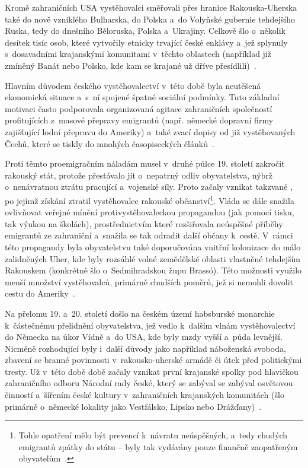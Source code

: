 Kromě zahraničních USA vystěhovalci směřovali přes hranice Rakouska-Uherska také do nově vzniklého Bulharska, do Polska a~do Volyňské gubernie tehdejšího Ruska, tedy do dnešního Běloruska, Polska a~Ukrajiny. Celkově šlo o~několik desítek tisíc osob, které vytvořily etnicky trvající české enklávy a~jež splynuly s~dosavadními krajanskými komunitami v~těchto oblastech (například již zmíněný Banát nebo Polsko, kde kam se krajané už dříve přesídlili)~\parencite{Nespor2005}.

Hlavním důvodem českého vystěhovalectví v~této době byla neutěšená ekonomická situace a~s~ní spojené špatné sociální podmínky. Tuto základní motivaci často podporovala organizovaná agitace zahraničních společností profitujících z~masové přepravy emigrantů (např. německé dopravní firmy zajišťující lodní přepravu do Ameriky) a~také zvací dopisy od již vystěhovaných Čechů, které se tiskly do mnohých časopiseckých článků~\parencite{Vaculik2009a}.

Proti těmto proemigračním náladám musel v~druhé půlce 19. století zakročit rakouský stát, protože přestávalo jít o~nepatrný odliv obyvatelstva, nýbrž o~nenávratnou ztrátu pracující a~vojenské síly. Proto začaly vznikat takzvané , po jejímž získání ztratil vystěhovalec rakouské občanství\footnote{Tohle opatření mělo být prevencí k~návratu neúspěšných, a~tedy chudých emigrantů zpátky do státu – byly tak vydávány pouze finančně zaopatřeným obyvatelům~\parencite{Vaculik2002}.}. Vláda se dále snažila ovlivňovat veřejné mínění protivystěhovaleckou propagandou (jak pomocí tisku, tak výukou na školách), prostřednictvím které rozšiřovala neúspěšné příběhy emigrantů ze zahraniční a~snažila se tak odradit další občany k~cestě. V~rámci této propagandy byla obyvatelstvu také doporučována vnitřní kolonizace do málo zalidněných Uher, kde byly rozsáhlé volné zemědělské oblasti vlastněné tehdejším Rakouskem (konkrétně šlo o~Sedmihradskou župu Brassó). Této možnosti využilo menší množství vystěhovalců, primárně chudších poměrů, jež si nemohli dovolit cestu do Ameriky~\parencite{Vaculik2009b}.

Na přelomu 19. a~20. století došlo na českém území habsburské monarchie k~částečnému přelidnění obyvatelstva, jež vedlo k~dalším vlnám vystěhovalectví do Německa na úkor Vídně a~do USA, kde byly mzdy vyšší a~půda levnější. Nicméně rozhodující byly i~další důvody jako například náboženská svoboda, zbavení se branné povinnosti v~rakousko-uherské armádě či útek před politickými tresty. Už v~této době době začaly vznikat první krajanské spolky pod hlavičkou zahraničního odboru Národní rady české, který se zabýval se zabýval osvětovou činností a~šířením české kultury v~zahraničních krajanských komunitách (šlo primárně o~německé lokality jako Vestfálsko, Lipsko nebo Drážďany)~\parencite{Vaculik2009b}.

